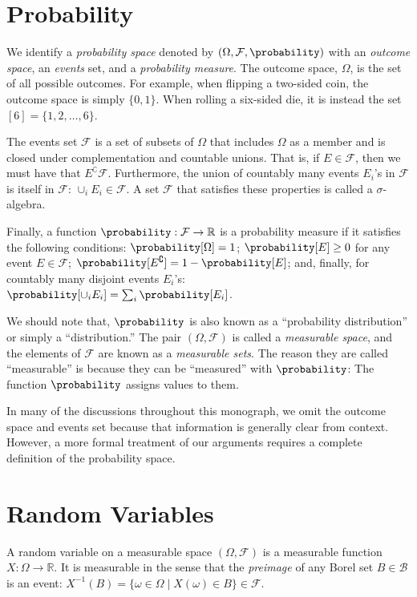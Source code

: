 \section{Probability}
We identify a \emph{probability space} denoted by $(\Omega, \mathcal{F}, \probability)$
with an \emph{outcome space}, an \emph{events} set, and a \emph{probability measure}.
The outcome space, $\Omega$, is the set of all
possible outcomes. For example, when flipping a two-sided coin, the outcome
space is simply $\{0, 1\}$. When rolling a six-sided die, it is instead
the set $[6] = \{ 1, 2, \ldots, 6\}$.

The events set $\mathcal{F}$ is a set of subsets of $\Omega$ that
includes $\Omega$ as a member and is closed under complementation and
countable unions. That is, if $E \in \mathcal{F}$,
then we must have that $E^\complement \mathcal{F}$.
Furthermore, the union of countably many events $E_i$'s
in $\mathcal{F}$ is itself in $\mathcal{F}$: $\cup_i E_i \in \mathcal{F}$.
A set $\mathcal{F}$ that satisfies these properties is called a $\sigma$-algebra.

Finally, a function $\probability: \mathcal{F} \rightarrow \mathbb{R}$ is
a probability measure if it satisfies the following conditions: $\probability[\Omega] = 1$;
$\probability[E] \geq 0$ for any event $E \in \mathcal{F}$;
$\probability[E^\complement] = 1 - \probability[E]$; and, finally,
for countably many disjoint events $E_i$'s:
$\probability[\cup_i E_i] = \sum_i \probability[E_i]$.

We should note that, $\probability$ is also known as a ``probability distribution''
or simply a ``distribution.'' The pair $(\Omega, \mathcal{F})$ is called
a \emph{measurable space}, and the elements of $\mathcal{F}$ are
known as a \emph{measurable sets}. The reason they are called ``measurable''
is because they can be ``measured'' with $\probability$: The function
$\probability$ assigns values to them.

In many of the discussions throughout this monograph, we omit the outcome space
and events set because that information is generally clear from context.
However, a more formal treatment of our arguments requires a complete
definition of the probability space.

\section{Random Variables}
A random variable on a measurable space $(\Omega, \mathcal{F})$ is
a measurable function $X: \Omega \rightarrow \mathbb{R}$.
It is measurable in the sense that the \emph{preimage} of any Borel set $B \in \mathcal{B}$
is an event: $X^{-1}(B) = \{ \omega \in \Omega \;|\; X(\omega) \in B \} \in \mathcal{F}$.

